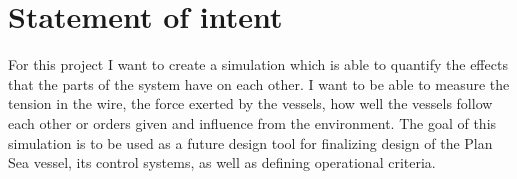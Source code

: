 \section{Statement of intent}
For this project I want to create a simulation which is able to quantify the effects that the parts of the system have on each other. I want to be able to measure the tension in the wire, the force exerted by the vessels, how well the vessels follow each other or orders given and influence from the environment. The goal of this simulation is to be used as a future design tool for finalizing design of the Plan Sea vessel, its control systems, as well as defining operational criteria. 